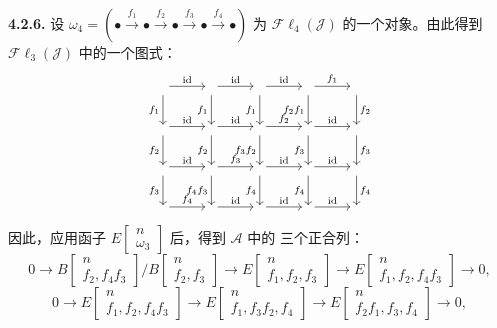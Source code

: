 \medskip\noindent\textbf{4.2.6.}
设
$\omega_4=(\mathord\bullet\xrightarrow{f_1}\mathord\bullet
\xrightarrow{f_2}\mathord\bullet\xrightarrow{f_3}\mathord\bullet
\xrightarrow{f_4}\mathord\bullet)$
为 $\mathcal{F}\ell_4(\mathcal J)$ 的一个对象。由此得到
$\mathcal{F}\ell_3(\mathcal J)$ 中的一个图式：
\[
\begin{tikzcd}[column sep=2.6em,row sep=2.15em]
{}\arrow[r,"\mathrm{id}"]\arrow[d,"f_1"']&
{}\arrow[r,"\mathrm{id}"]\arrow[d,"f_1"']&
{}\arrow[r,"\mathrm{id}"]\arrow[d,"f_1"']&
{}\arrow[r,"f_1"]\arrow[d,"f_2f_1"']&
{}\arrow[d,"f_2"]\\
{}\arrow[r,"\mathrm{id}"]\arrow[d,"f_2"']&
{}\arrow[r,"\mathrm{id}"]\arrow[d,"f_2"']&
{}\arrow[r,"f_2"]\arrow[d,"f_3f_2"']&
{}\arrow[r,"\mathrm{id}"]\arrow[d,"f_3"']&
{}\arrow[d,"f_3"]\\
{}\arrow[r,"\mathrm{id}"]\arrow[d,"f_3"']&
{}\arrow[r,"f_3"]\arrow[d,"f_4f_3"']&
{}\arrow[r,"\mathrm{id}"]\arrow[d,"f_4"']&
{}\arrow[r,"\mathrm{id}"]\arrow[d,"f_4"']&
{}\arrow[d,"f_4"]\\
{}\arrow[r,"f_4"]&
{}\arrow[r,"\mathrm{id}"]&
{}\arrow[r,"\mathrm{id}"]&
{}\arrow[r,"\mathrm{id}"]&{}
\end{tikzcd}
\]
因此，应用函子
$E\!\begin{bmatrix}n\\ \omega_3\end{bmatrix}$ 后，得到 $\mathcal A$ 中的
三个正合列：
\[
0\longrightarrow
B\!\begin{bmatrix}n\\ f_2,f_4f_3\end{bmatrix}
 \Big/
B\!\begin{bmatrix}n\\ f_2,f_3\end{bmatrix}
\longrightarrow
E\!\begin{bmatrix}n\\ f_1,f_2,f_3\end{bmatrix}
\longrightarrow
E\!\begin{bmatrix}n\\ f_1,f_2,f_4f_3\end{bmatrix}
\longrightarrow0,
\]
\[
0\longrightarrow
E\!\begin{bmatrix}n\\ f_1,f_2,f_4f_3\end{bmatrix}
\longrightarrow
E\!\begin{bmatrix}n\\ f_1,f_3f_2,f_4\end{bmatrix}
\longrightarrow
E\!\begin{bmatrix}n\\ f_2f_1,f_3,f_4\end{bmatrix}
\longrightarrow0,
\]
\endgroup
